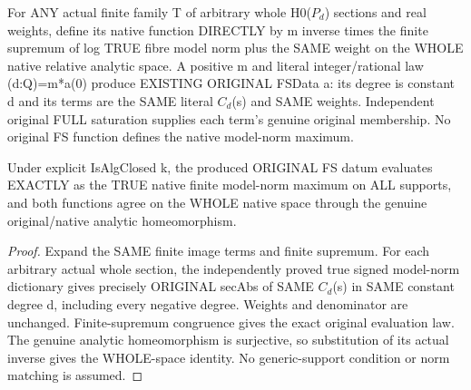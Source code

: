 \begin{definition}
\label{def:seven-native-signed-finite-model-norm-families}
\leanok
For ANY actual finite family T of arbitrary whole H0($P_d$) sections and
real weights, define its native function DIRECTLY by m inverse times
the finite supremum of log TRUE fibre model norm plus the SAME weight
on the WHOLE native relative analytic space. A positive m and literal
integer/rational law (d:Q)=m*a(0) produce EXISTING ORIGINAL FSData a:
its degree is constant d and its terms are the SAME literal $C_d$(s)
and SAME weights. Independent original FULL saturation supplies each
term's genuine original membership. No original FS function defines
the native model-norm maximum.
\end{definition}

\begin{theorem}
\label{thm:seven-native-signed-finite-family-original-eval}
\leanok
Under explicit IsAlgClosed k, the produced ORIGINAL FS datum evaluates
EXACTLY as the TRUE native finite model-norm maximum on ALL supports,
and both functions agree on the WHOLE native space through the genuine
original/native analytic homeomorphism.
\end{theorem}
\begin{proof}
Expand the SAME finite image terms and finite supremum. For each
arbitrary actual whole section, the independently proved true signed
model-norm dictionary gives precisely ORIGINAL secAbs of SAME $C_d$(s)
in SAME constant degree d, including every negative degree. Weights
and denominator are unchanged. Finite-supremum congruence gives the
exact original evaluation law. The genuine analytic homeomorphism is
surjective, so substitution of its actual inverse gives the WHOLE-space
identity. No generic-support condition or norm matching is assumed.
\end{proof}

